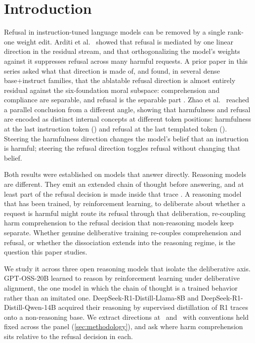 \section{Introduction}\label{introduction}

Refusal in instruction-tuned language models can be removed by a single rank-one
weight edit. Arditi et al.~\citep{arditi2024refusal} showed that refusal is
mediated by one linear direction in the residual stream, and that orthogonalizing
the model's weights against it suppresses refusal across many harmful requests.
A prior paper in this series asked what that direction is made of, and found, in
several dense base+instruct families, that the ablatable refusal direction is
almost entirely residual against the six-foundation moral subspace: comprehension
and compliance are separable, and refusal is the separable part
\citep{reblitzrichardson2026crossmodel}. Zhao et al.~\citep{zhao2025harmfulness}
reached a parallel conclusion from a different angle, showing that harmfulness and
refusal are encoded as distinct internal concepts at different token positions:
harmfulness at the last instruction token (\tinst) and refusal at the last
templated token (\tpost). Steering the harmfulness direction changes the model's
belief that an instruction is harmful; steering the refusal direction toggles
refusal without changing that belief.

Both results were established on models that answer directly. Reasoning models are
different. They emit an extended chain of thought before answering, and at least
part of the refusal decision is made inside that trace
\citep{yamaguchi2025reasoning}. A reasoning model that has been trained, by
reinforcement learning, to deliberate about whether a request is harmful might
route its refusal through that deliberation, re-coupling harm comprehension to the
refusal decision that non-reasoning models keep separate. Whether genuine
deliberative training re-couples comprehension and refusal, or whether the
dissociation extends into the reasoning regime, is the question this paper studies.

We study it across three open reasoning models that isolate the deliberative axis.
GPT-OSS-20B \citep{openai2025gptoss} learned to reason by reinforcement learning
under deliberative alignment, the one model in which the chain of thought is a
trained behavior rather than an imitated one. DeepSeek-R1-Distill-Llama-8B and
DeepSeek-R1-Distill-Qwen-14B \citep{deepseek2025r1} acquired their reasoning by
supervised distillation of R1 traces onto a non-reasoning base. We extract
directions at \tinst~and \tpost~with conventions held fixed across the panel
(\autoref{sec:methodology}), and ask where harm comprehension sits relative to the
refusal decision in each.

